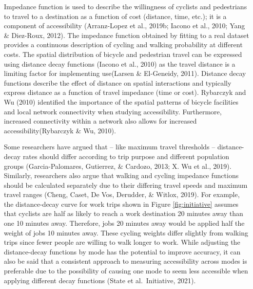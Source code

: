 \documentclass[12pt,twoside]{reedthesis}
\begin{document}
Impedance function is used to describe the willingness of cyclists and pedestrians to travel to a destination as a function of cost (distance, time, etc.); it is a component of accessibility (Arranz-Lopez et al., 2019b; Iacono et al., 2010; Yang \& Diez-Roux, 2012). The impedance function obtained by fitting to a real dataset provides a continuous description of cycling and walking probability at different costs. The spatial distribution of bicycle and pedestrian travel can be expressed using distance decay functions (Iacono et al., 2010) as the travel distance is a limiting factor for implementing use(Larsen \& El-Geneidy, 2011). Distance decay functions describe the effect of distance on spatial interactions and typically express distance as a function of travel impedance (time or cost). Rybarczyk and Wu (2010) identified the importance of the spatial patterns of bicycle facilities and local network connectivity when studying accessibility. Furthermore, increased connectivity within a network also allows for increased accessibility(Rybarczyk \& Wu, 2010).

Some researchers have argued that -- like maximum travel thresholds -- distance-decay rates should differ according to trip purpose and different population groups (Garcia-Palomares, Gutierrez, \& Cardozo, 2013; X. Wu et al., 2019). Similarly, researchers also argue that walking and cycling impedance functions should be calculated separately due to their differing travel speeds and maximum travel ranges (Cheng, Caset, De Vos, Derudder, \& Witlox, 2019). For example, the distance-decay curve for work trips shown in Figure \ref{fig:initiative} assumes that cyclists are half as likely to reach a work destination 20 minutes away than one 10 minutes away. Therefore, jobs 20 minutes away would be applied half the weight of jobs 10 minutes away. These cycling weights differ slightly from walking trips since fewer people are willing to walk longer to work. While adjusting the distance-decay functions by mode has the potential to improve accuracy, it can also be said that a consistent approach to measuring accessibility across modes is preferable due to the possibility of causing one mode to seem less accessible when applying different decay functions (State et al.~Initiative, 2021).
\end{document}
